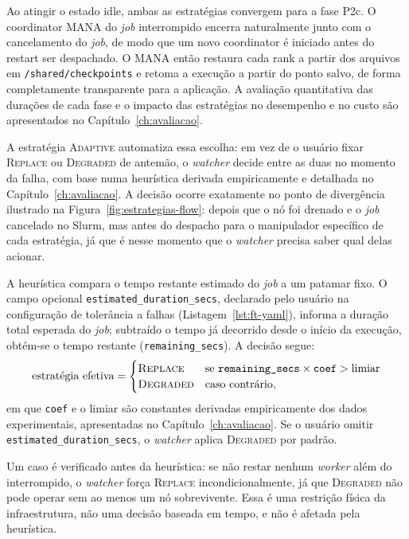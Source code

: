 Ao atingir o estado idle, ambas as estratégias convergem para a fase P2c. O coordinator
MANA do \textit{job} interrompido encerra naturalmente junto com o cancelamento do \textit{job}, de modo
que um novo coordinator é iniciado antes do restart ser despachado. O MANA então
restaura cada rank a partir dos arquivos em \texttt{/shared/checkpoints} e retoma a
execução a partir do ponto salvo, de forma completamente transparente para a aplicação. A avaliação
quantitativa das durações de cada fase e o impacto das estratégias no desempenho e no
custo são apresentados no Capítulo~\ref{ch:avaliacao}.

A estratégia \textsc{Adaptive} automatiza essa escolha: em vez de o usuário fixar
\textsc{Replace} ou \textsc{Degraded} de antemão, o \textit{watcher} decide entre as
duas no momento da falha, com base numa heurística derivada empiricamente e detalhada
no Capítulo~\ref{ch:avaliacao}. A decisão ocorre exatamente no ponto de divergência
ilustrado na Figura~\ref{fig:estrategias-flow}: depois que o nó foi drenado e o
\textit{job} cancelado no Slurm, mas antes do despacho para o manipulador específico
de cada estratégia, já que é nesse momento que o \textit{watcher} precisa saber qual
delas acionar.

A heurística compara o tempo restante estimado do \textit{job} a um patamar fixo. O
campo opcional \texttt{estimated\_duration\_secs}, declarado pelo usuário na
configuração de tolerância a falhas (Listagem~\ref{lst:ft-yaml}), informa a duração
total esperada do \textit{job}; subtraído o tempo já decorrido desde o início da
execução, obtém-se o tempo restante (\texttt{remaining\_secs}). A decisão segue:
$$\text{estratégia efetiva} = \begin{cases} \textsc{Replace} & \text{se }
\texttt{remaining\_secs} \times \texttt{coef} > \text{limiar} \\ \textsc{Degraded} &
\text{caso contrário,} \end{cases}$$
em que \texttt{coef} e o limiar são constantes derivadas empiricamente dos dados
experimentais, apresentadas no Capítulo~\ref{ch:avaliacao}. Se o usuário omitir
\texttt{estimated\_duration\_secs}, o \textit{watcher} aplica \textsc{Degraded} por
padrão.

Um caso é verificado antes da heurística: se não restar nenhum \textit{worker} além do
interrompido, o \textit{watcher} força \textsc{Replace} incondicionalmente, já que
\textsc{Degraded} não pode operar sem ao menos um nó sobrevivente. Essa é uma
restrição física da infraestrutura, não uma decisão baseada em tempo, e não é afetada
pela heurística.

